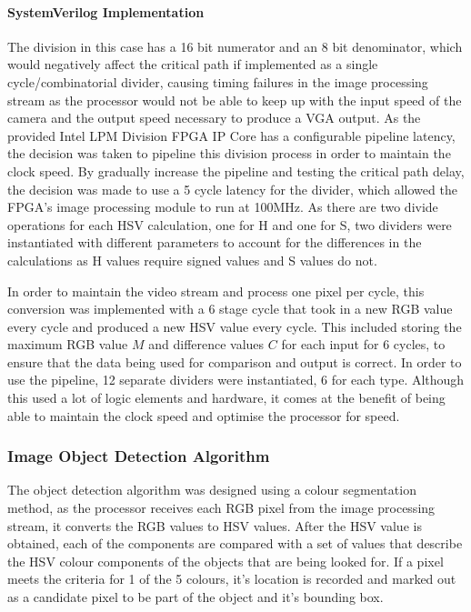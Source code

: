 \documentclass[a4paper]{article}
\begin{document}
\paragraph*{SystemVerilog Implementation}
\vspace{-6pt}
The division in this case has a 16 bit numerator and an 8 bit denominator, which
would negatively affect the critical path if implemented as a single cycle/combinatorial
divider, causing timing failures in the image processing stream as the processor 
would not be able to keep up with the input speed of the camera and the
output speed necessary to produce a VGA output. As the provided Intel LPM Division FPGA 
IP Core has a configurable pipeline latency, the decision was taken to pipeline this division
process in order to maintain the clock speed. By gradually increase the pipeline 
and testing the critical path delay, the decision was made to use a 5 cycle latency
for the divider, which allowed the FPGA's image processing module to run at 100MHz. As there are two divide operations for each HSV calculation, one for H and one for S,
two dividers were instantiated with different parameters to account for the differences 
in the calculations as H values require signed values and S values do not. 

In order to maintain the video stream and process one pixel per cycle, this conversion 
was implemented with a 6 stage cycle that took in a new RGB value every cycle and
produced a new HSV value every cycle. This included storing the maximum RGB value \( M \) and difference
values \(C \) for each input for 6 cycles, to ensure that the data being used for 
comparison and output is correct. In order to use the pipeline, 12 separate dividers
were instantiated, 6 for each type. Although this used a lot of logic 
elements and hardware, it comes at the benefit of being able to maintain the clock 
speed and optimise the processor for speed. 




   


\subsubsection{Image Object Detection Algorithm}

The object detection algorithm was designed using a colour segmentation method, as 
the processor receives each RGB pixel from the image processing stream, it converts the 
RGB values to HSV values. After the HSV value is obtained, each of the components 
are compared with a set of values that describe the HSV colour components of the objects 
that are being looked for. If a pixel meets the criteria for 1 of the 5 colours, it's 
location is recorded and marked out as a candidate pixel to be part of the object and 
it's bounding box. 
\end{document}
